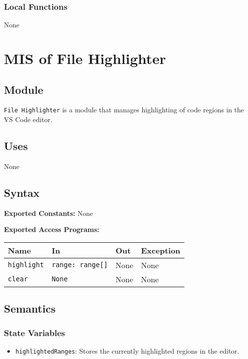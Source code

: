 \documentclass[12pt, titlepage]{article}
\begin{document}
\subsubsection{Local Functions}
None

\section{MIS of File Highlighter}

\subsection{Module}
\texttt{File Highlighter} is a module that manages highlighting of code regions in the VS Code editor.

\subsection{Uses}
None

\subsection{Syntax}

\textbf{Exported Constants:} None

\noindent \textbf{Exported Access Programs:}\\
\begin{tabularx}{\linewidth}{|l|>{\raggedright\arraybackslash}X|l|l|}
  \hline
  \textbf{Name} & \textbf{In} & \textbf{Out} & \textbf{Exception} \\
  \hline
  \texttt{highlight} & \texttt{range: range[]} & None & None \\ \hline
  \texttt{clear} & \texttt{None} & None & None \\
  \hline
\end{tabularx}

\subsection{Semantics}

\subsubsection{State Variables}
\begin{itemize}
\item \texttt{highlightedRanges}: Stores the currently highlighted regions in the editor.
\end{itemize}
\end{document}
